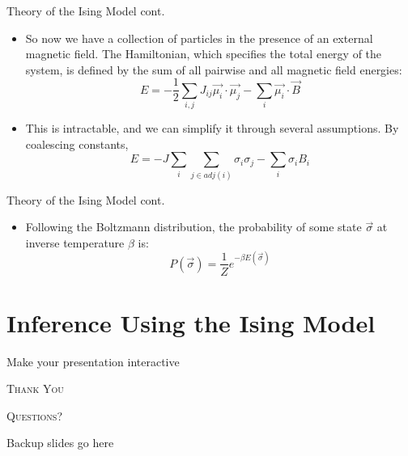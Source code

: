 \documentclass{minesbeamer}
\begin{document}
\begin{frame}{Theory of the Ising Model cont.}
    \centering
    \begin{itemize}
        \item So now we have a collection of particles in the presence of an external magnetic field. The Hamiltonian, which specifies the total energy of the system, is defined by the sum of all pairwise and all magnetic field energies:$$E = -\frac{1}{2}\sum_{i,j}J_{ij}\overrightarrow{\mu_i}\cdot\overrightarrow{\mu_j}-\sum_i \overrightarrow{\mu_i}\cdot\overrightarrow{B}$$
        \item This is intractable, and we can simplify it through several assumptions. By coalescing constants,$$E=-J\sum_i\sum_{j\in adj(i)}\sigma_i\sigma_j -\sum_i \sigma_i B_i$$
    \end{itemize}
\end{frame}

\begin{frame}{Theory of the Ising Model cont.}
    \centering
    \begin{itemize}
        \item Following the Boltzmann distribution, the probability of some state $\overrightarrow{\sigma}$ at inverse temperature $\beta$ is:$$P(\overrightarrow{\sigma}) = \frac{1}{Z}e^{-\beta E(\overrightarrow{\sigma})}$$
    \end{itemize}
\end{frame}

\section{Inference Using the Ising Model}

\begin{frame}{Make your presentation interactive}
    \begin{cublock}
        \begin{overlayarea}{\textwidth}{\baselineskip}
        \end{overlayarea}
    \end{cublock}
\end{frame}

\begin{frame}[standout]
    \Huge\textsc{Thank You}
    
    \vfill
    
    \LARGE\textsc{Questions?}
\end{frame}

\appendix

\begin{frame}{Backup slides go here}
    
\end{frame}
\end{document}
